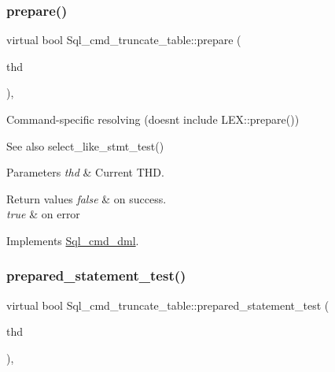 \subsubsection{\texorpdfstring{prepare()}{prepare()}}
{\footnotesize\ttfamily virtual bool Sql\+\_\+cmd\+\_\+truncate\+\_\+table\+::prepare (\begin{DoxyParamCaption}\item[{T\+HD $\ast$}]{thd }\end{DoxyParamCaption})\hspace{0.3cm}{\ttfamily [inline]}, {\ttfamily [virtual]}}

Command-\/specific resolving (doesn\textquotesingle{}t include L\+E\+X\+::prepare())

\begin{DoxySeeAlso}{See also}
select\+\_\+like\+\_\+stmt\+\_\+test()
\end{DoxySeeAlso}

\begin{DoxyParams}{Parameters}
{\em thd} & Current T\+HD.\\
\hline
\end{DoxyParams}

\begin{DoxyRetVals}{Return values}
{\em false} & on success. \\
\hline
{\em true} & on error \\
\hline
\end{DoxyRetVals}


Implements \mbox{\hyperlink{classSql__cmd__dml_ad395374af7ac799573ca41d87b60b977}{Sql\+\_\+cmd\+\_\+dml}}.

\mbox{\label{classSql__cmd__truncate__table_acad0a1ad1b5137184b19d333abc3b1ba}} 
\subsubsection{\texorpdfstring{prepared\+\_\+statement\+\_\+test()}{prepared\_statement\_test()}}
{\footnotesize\ttfamily virtual bool Sql\+\_\+cmd\+\_\+truncate\+\_\+table\+::prepared\+\_\+statement\+\_\+test (\begin{DoxyParamCaption}\item[{T\+HD $\ast$}]{thd }\end{DoxyParamCaption})\hspace{0.3cm}{\ttfamily [inline]}, {\ttfamily [virtual]}}

